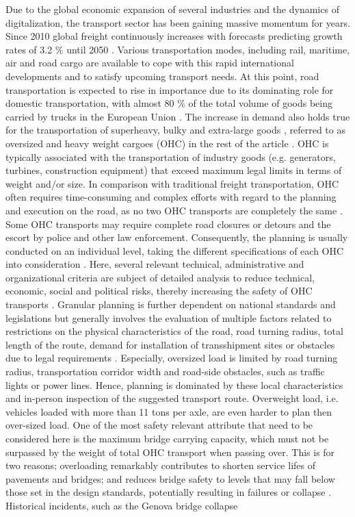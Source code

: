 
Due to the global economic expansion of several industries and the dynamics of digitalization, the transport sector has been gaining massive momentum for years. Since 2010 global freight continuously increases with forecasts predicting growth rates of 3.2 \% until 2050 \cite{figura2020preferences, InternationalTransportForum}. Various transportation modes, including rail, maritime, air and road cargo are available to cope with this rapid international developments and to satisfy upcoming transport needs. At this point, road transportation is expected to rise in importance due to its dominating role for domestic transportation, with almost 80 \% of the total volume of goods being carried by trucks in the European Union \cite{Eurostat}. The increase in demand also holds true for the transportation of superheavy, bulky and extra-large goods \cite{gavrilova2021analysis}, referred to as oversized and heavy weight cargoes (OHC) in the rest of the article \cite{Luo.2021}. OHC is typically associated with the transportation of industry goods (e.g. generators, turbines, construction equipment) that exceed maximum legal limits in terms of weight and/or size. In comparison with traditional freight transportation, OHC often requires time-consuming and complex efforts with regard to the planning and execution on the road, as no two OHC transports are completely the same \cite{Wolnowska.2019}. Some OHC transports may require complete road closures or detours and the escort by police and other law enforcement. Consequently, the planning is usually conducted on an individual level, taking the different specifications of each OHC into consideration \cite{Bazaras.2013}. Here, several relevant technical, administrative and organizational criteria are subject of detailed analysis to reduce technical, economic, social and political risks, thereby increasing the safety of OHC transports \cite{Palsaitis.2012}. Granular planning is further dependent on national standards and legislations but generally involves the evaluation of multiple factors related to restrictions on the physical characteristics of the road, road turning radius, total length of the route, demand for installation of transshipment sites or obstacles due to legal requirements \cite{PETRASKA.2018}. Especially, oversized load is limited by road turning radius, transportation corridor width and road-side obstacles, such as traffic lights or power lines. Hence, planning is dominated by these local characteristics and in-person inspection of the suggested transport route. Overweight load, i.e. vehicles loaded with more than 11 tons per axle, are even harder to plan then over-sized load. One of the most safety relevant attribute that need to be considered here is the maximum bridge carrying capacity, which must not be surpassed by the weight of total OHC transport when passing over. This is for two reasons; overloading remarkably contributes to shorten service lifes of pavements and bridges; and reduces bridge safety to levels that may fall below those set in the design standards, potentially resulting in failures or collapse \cite{fiorillo2018fragility}. Historical incidents, such as the Genova bridge collapse 